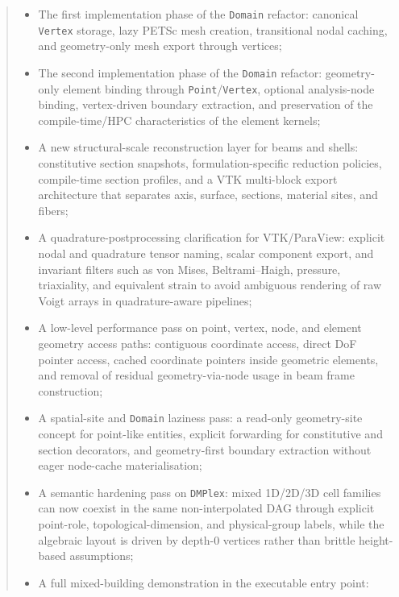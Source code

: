 \documentclass[11pt,a4paper]{report}
\theoremstyle{definition}
\begin{document}
\begin{abstract}
\begin{itemize}[nosep]
        compile-time-oriented HPC design philosophy;
  \item The first implementation phase of the \texttt{Domain} refactor:
        canonical \texttt{Vertex} storage, lazy PETSc mesh creation,
        transitional nodal caching, and geometry-only mesh export through
        vertices;
  \item The second implementation phase of the \texttt{Domain} refactor:
        geometry-only element binding through \texttt{Point}/\texttt{Vertex},
        optional analysis-node binding, vertex-driven boundary extraction, and
        preservation of the compile-time/HPC characteristics of the element
        kernels;
  \item A new structural-scale reconstruction layer for beams and shells:
        constitutive section snapshots, formulation-specific reduction
        policies, compile-time section profiles, and a VTK multi-block export
        architecture that separates axis, surface, sections, material sites,
        and fibers;
  \item A quadrature-postprocessing clarification for VTK/ParaView:
        explicit nodal and quadrature tensor naming, scalar component export,
        and invariant filters such as von Mises, Beltrami--Haigh, pressure,
        triaxiality, and equivalent strain to avoid ambiguous rendering of
        raw Voigt arrays in quadrature-aware pipelines;
  \item A low-level performance pass on point, vertex, node, and element
        geometry access paths: contiguous coordinate access, direct DoF pointer
        access, cached coordinate pointers inside geometric elements, and
        removal of residual geometry-via-node usage in beam frame
        construction;
  \item A spatial-site and \texttt{Domain} laziness pass: a read-only
        geometry-site concept for point-like entities, explicit forwarding for
        constitutive and section decorators, and geometry-first boundary
        extraction without eager node-cache materialisation;
  \item A semantic hardening pass on \texttt{DMPlex}: mixed 1D/2D/3D cell
        families can now coexist in the same non-interpolated DAG through
        explicit point-role, topological-dimension, and physical-group labels,
        while the algebraic layout is driven by depth-$0$ vertices rather than
        brittle height-based assumptions;
  \item A full mixed-building demonstration in the executable entry point:

\end{itemize}
\end{abstract}
\end{document}
